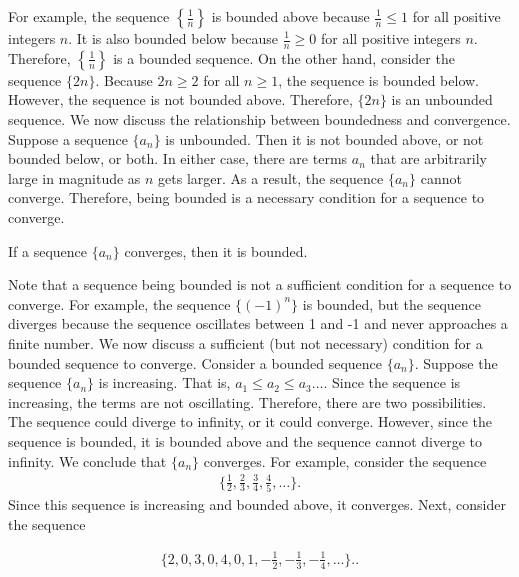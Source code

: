 \documentclass{report}
\begin{document}
      \bigbreak \noindent 
      For example, the sequence \( \left\{\frac{1}{n}\right\} \) is bounded above because \( \frac{1}{n} \leq 1 \) for all positive integers \( n \). It is also bounded below because \( \frac{1}{n} \geq 0 \) for all positive integers \( n \). Therefore, \( \left\{\frac{1}{n}\right\} \) is a bounded sequence. On the other hand, consider the sequence \( \{2n\} \). Because \( 2n \geq 2 \) for all \( n \geq 1 \), the sequence is bounded below. However, the sequence is not bounded above. Therefore, \( \{2n\} \) is an unbounded sequence.
      \bigbreak \noindent 
    We now discuss the relationship between boundedness and convergence. Suppose a sequence \( \{a_n\} \) is unbounded. Then it is not bounded above, or not bounded below, or both. In either case, there are terms \( a_n \) that are arbitrarily large in magnitude as \( n \) gets larger. As a result, the sequence \( \{a_n\} \) cannot converge. Therefore, being bounded is a necessary condition for a sequence to converge.

    \bigbreak \noindent 
    \begin{thrm}
        If a sequence  $\{a_{n}\} $ converges, then it is bounded. 
    \end{thrm}
    \bigbreak \noindent 
    Note that a sequence being bounded is not a sufficient condition for a sequence to converge. For example, the sequence \( \{(-1)^n\} \) is bounded, but the sequence diverges because the sequence oscillates between 1 and -1 and never approaches a finite number. We now discuss a sufficient (but not necessary) condition for a bounded sequence to converge.
    \bigbreak \noindent 
    Consider a bounded sequence \( \{a_n\} \). Suppose the sequence \( \{a_n\} \) is increasing. That is, \( a_1 \leq a_2 \leq a_3 \ldots \). Since the sequence is increasing, the terms are not oscillating. Therefore, there are two possibilities. The sequence could diverge to infinity, or it could converge. However, since the sequence is bounded, it is bounded above and the sequence cannot diverge to infinity. We conclude that \( \{a_n\} \) converges. For example, consider the sequence
    \bigbreak \noindent 
    \begin{align*}
        \bigg\{\frac{1}{2}, \frac{2}{3}, \frac{3}{4}, \frac{4}{5}, \ldots\bigg\}
    .\end{align*}
    \bigbreak \noindent 
    Since this sequence is increasing and bounded above, it converges. Next, consider the sequence

    \begin{align*}
        \{2,0,3,0,4,0,1,−\frac{1}{2},−\frac{1}{3},−\frac{1}{4},\ldots\}.
    .\end{align*}
\end{document}
